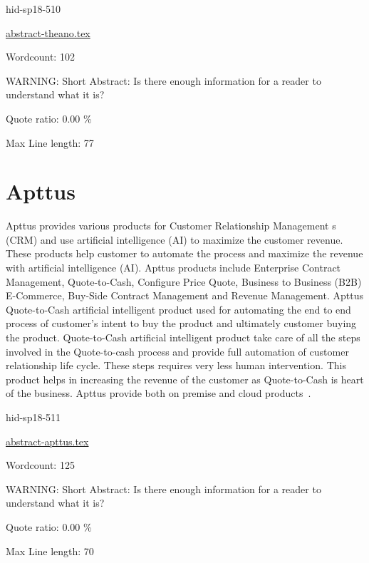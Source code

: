 \begin{IU}

hid-sp18-510

\href{https://github.com/cloudmesh-community/hid-sp18-510/blob/master//technology/abstract-theano.tex}{abstract-theano.tex}

 

Wordcount: 102

WARNING: Short Abstract: Is there enough information for a reader to understand what it is?


Quote ratio: 0.00 \%
 
Max Line length: 77
\end{IU}

\section{Apttus}

Apttus provides various products for Customer Relationship Management
s (CRM) and use artificial intelligence (AI) to maximize the customer
revenue. These products help customer to automate the process and
maximize the revenue with artificial intelligence (AI). Apttus
products include Enterprise Contract Management, Quote-to-Cash,
Configure Price Quote, Business to Business (B2B) E-Commerce, Buy-Side
Contract Management and Revenue Management. Apttus Quote-to-Cash
artificial intelligent product used for automating the end to end
process of customer's intent to buy the product and ultimately
customer buying the product. Quote-to-Cash artificial intelligent
product take care of all the steps involved in the Quote-to-cash
process and provide full automation of customer relationship life
cycle. These steps requires very less human intervention. This product
helps in increasing the revenue of the customer as Quote-to-Cash is
heart of the business. Apttus provide both on premise and cloud
products~\cite{hid-sp18-511-apttus}.
 


\begin{IU}

hid-sp18-511

\href{https://github.com/cloudmesh-community/hid-sp18-511/blob/master//technology/abstract-apttus.tex}{abstract-apttus.tex}

 

Wordcount: 125

WARNING: Short Abstract: Is there enough information for a reader to understand what it is?


Quote ratio: 0.00 \%
 
Max Line length: 70
\end{IU}

